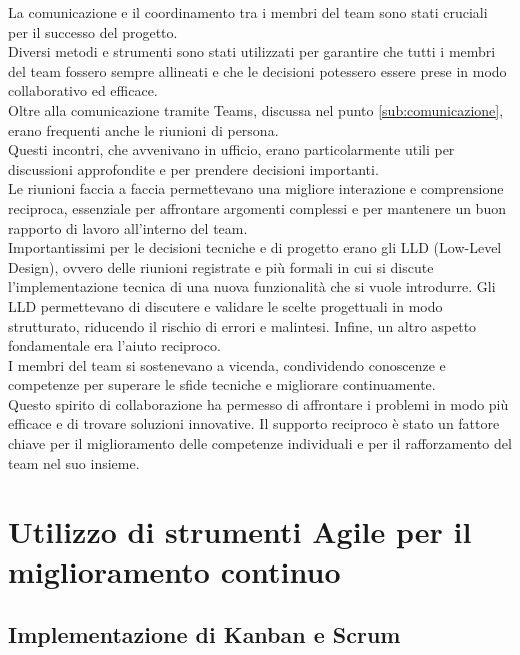 La comunicazione e il coordinamento tra i membri del team sono stati cruciali per
il successo del progetto.\\ Diversi metodi e strumenti sono stati utilizzati per
garantire che tutti i membri del team fossero sempre allineati e che le decisioni
potessero essere prese in modo collaborativo ed efficace.\\ Oltre alla comunicazione
tramite Teams, discussa nel punto \ref{sub:comunicazione}, erano frequenti anche
le riunioni di persona.\\ Questi incontri, che avvenivano in ufficio, erano particolarmente
utili per discussioni approfondite e per prendere decisioni importanti.\\ Le riunioni
faccia a faccia permettevano una migliore interazione e comprensione reciproca,
essenziale per affrontare argomenti complessi e per mantenere un buon rapporto
di lavoro all'interno del team.\\ Importantissimi per le decisioni tecniche e di
progetto erano gli LLD (Low-Level Design), ovvero delle riunioni registrate e più
formali in cui si discute l'implementazione tecnica di una nuova funzionalità che
si vuole introdurre. Gli LLD permettevano di discutere e validare le scelte
progettuali in modo strutturato, riducendo il rischio di errori e malintesi.
Infine, un altro aspetto fondamentale era l'aiuto reciproco.\\ I membri del team
si sostenevano a vicenda, condividendo conoscenze e competenze per superare le
sfide tecniche e migliorare continuamente.\\ Questo spirito di collaborazione ha
permesso di affrontare i problemi in modo più efficace e di trovare soluzioni
innovative. Il supporto reciproco è stato un fattore chiave per il miglioramento
delle competenze individuali e per il rafforzamento del team nel suo insieme.

\section{Utilizzo di strumenti Agile per il miglioramento continuo}
\label{sec:strumenti_agile}

\subsection{Implementazione di Kanban e Scrum}
\label{sub:kanban_scrum}

